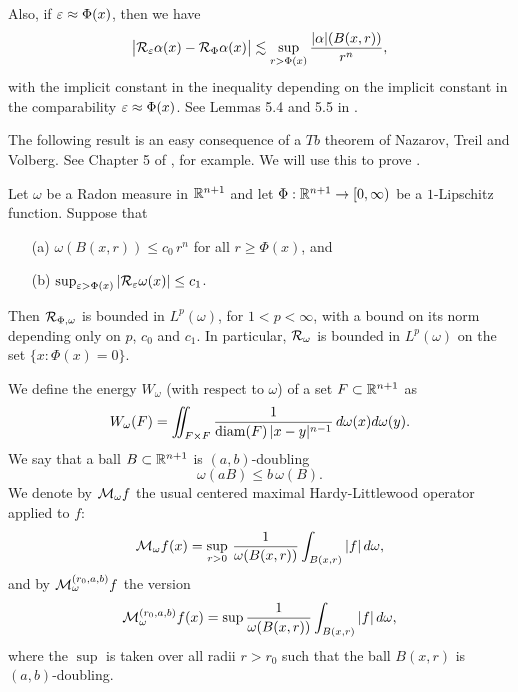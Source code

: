 Also, if ${\varepsilon}\approx\Phi(x)$, then we have
\begin{equation}
\label{e.compsup''}
\bigl|{\mathcal R}_{{\varepsilon}}\alpha(x) - {\mathcal R}_{\Phi}\alpha(x)\bigr|\lesssim  \sup_{r> \Phi(x)}\frac{|\alpha|(B(x,r))}{r^n},
\end{equation}
with the implicit constant in the inequality depending on the implicit constant in the comparability ${\varepsilon}\approx\Phi(x)$.
See Lemmas 5.4 and 5.5 in \cite{Tolsa-llibre}. 

The following result is an easy consequence of a $Tb$ theorem of Nazarov, Treil and Volberg.
See Chapter 5 of \cite{Tolsa-llibre}, for example. We will use this to prove .

\begin{theorem}\label{teontv}
Let $\omega$ be a Radon measure in ${\mathbb R}^{n+1}$ and let $\Phi:{\mathbb R}^{n+1}\to[0,\infty)$ be a $1$-Lipschitz function. Suppose that
\begin{itemize}
\item[(a)] $\omega(B(x,r))\leq c_0\,r^n$ for all $r\geq \Phi(x)$, and
\item[(b)] $\sup_{{\varepsilon}>\Phi(x)}|{\mathcal R}_{\varepsilon}\omega(x)|\leq c_1$.
\end{itemize}
Then ${\mathcal R}_{\Phi,\omega}$ is bounded in $L^p(\omega)$, for $1<p<\infty$, with a bound on its norm depending only on $p$, $c_0$ and
$c_1$. In particular, ${\mathcal R}_\omega$ is bounded in $L^p(\omega)$ on the set $\{x:\Phi(x)=0\}$.
\end{theorem}
\vv



We define the energy $W_\omega$ (with respect to $\omega$) of a set $F\subset {\mathbb R}^{n+1}$ as
$$W_\omega(F) = \iint_{F\times F} \frac1{{\rm diam}(F)\,|x-y|^{n-1}}\,d\omega(x)d\omega(y).$$
We say that a ball $B\subset {\mathbb R}^{n+1}$ is $(a,b)$-doubling $$\omega(aB)\leq b\,\omega(B).$$
We denote by ${\mathcal M}_\omega f$ the usual centered maximal Hardy-Littlewood operator applied to $f$:
$${\mathcal M}_\omega f(x) = \sup_{r>0}\,\frac1{\omega(B(x,r))}\int_{B(x,r)}|f|\,d\omega,$$
and by ${\mathcal M}_\omega^{(r_0,a,b)} f$ the version
$${\mathcal M}_\omega^{(r_0,a,b)} f(x) = \sup\frac1{\omega(B(x,r))}\int_{B(x,r)}|f|\,d\omega,$$
where the $\sup$ is taken over all radii $r>r_0$ such that the ball $B(x,r)$ is $(a,b)$-doubling.

